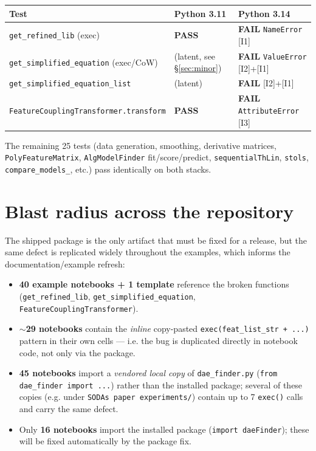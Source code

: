 \documentclass[11pt]{article}
\newcommand{\code}[1]{\texttt{\small #1}}
\newcommand{\PASS}{\textcolor{pass}{\textbf{PASS}}}
\newcommand{\FAIL}{\textcolor{fail}{\textbf{FAIL}}}
\begin{document}
\begin{center}
\begin{tabular}{lll}
\toprule
\textbf{Test} & \textbf{Python 3.11} & \textbf{Python 3.14} \\
\midrule
\code{get\_refined\_lib} (exec)            & \PASS{} & \FAIL{} \code{NameError} [I1] \\
\code{get\_simplified\_equation} (exec/CoW)& (latent, see \S\ref{sec:minor}) & \FAIL{} \code{ValueError} [I2]+[I1] \\
\code{get\_simplified\_equation\_list}     & (latent) & \FAIL{} [I2]+[I1] \\
\code{FeatureCouplingTransformer.transform}& \PASS{} & \FAIL{} \code{AttributeError} [I3] \\
\bottomrule
\end{tabular}
\end{center}

\noindent The remaining 25 tests (data generation, smoothing, derivative matrices,
\code{PolyFeatureMatrix}, \code{AlgModelFinder} fit/score/predict,
\code{sequentialThLin}, \code{stols}, \code{compare\_models\_}, etc.) pass
identically on both stacks.

\section{Blast radius across the repository}

The shipped package is the only artifact that must be fixed for a release, but the
same defect is replicated widely throughout the examples, which informs the
documentation/example refresh:

\begin{itemize}[itemsep=2pt]
  \item \textbf{40 example notebooks + 1 template} reference the broken functions
        (\code{get\_refined\_lib}, \code{get\_simplified\_equation},
        \code{FeatureCouplingTransformer}).
  \item \textbf{$\sim$29 notebooks} contain the \emph{inline} copy-pasted
        \code{exec(feat\_list\_str + ...)} pattern in their own cells --- i.e. the
        bug is duplicated directly in notebook code, not only via the package.
  \item \textbf{45 notebooks} import a \emph{vendored local copy} of
        \code{dae\_finder.py} (\code{from dae\_finder import ...}) rather than the
        installed package; several of these copies
        (e.g. under \code{SODAs paper experiments/}) contain up to 7 \code{exec()}
        calls and carry the same defect.
  \item Only \textbf{16 notebooks} import the installed package
        (\code{import daeFinder}); these will be fixed automatically by the package
        fix.
\end{itemize}
\end{document}
